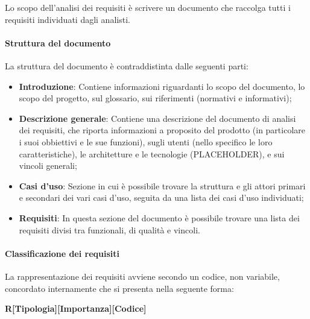 \documentclass[../norme_di_progetto.tex]{subfiles}
\begin{document}
Lo scopo dell'analisi dei requisiti è scrivere un documento che raccolga tutti i requisiti individuati dagli analisti.

\paragraph{Struttura del documento}

La struttura del documento è contraddistinta dalle seguenti parti:
\begin{itemize}
    \item \textbf{Introduzione}: Contiene informazioni riguardanti lo scopo del documento, lo scopo del progetto, sul glossario, sui riferimenti (normativi e informativi);
    \item \textbf{Descrizione generale}: Contiene una descrizione del documento di analisi dei requisiti, che riporta informazioni a proposito del prodotto (in particolare i suoi obbiettivi e le sue funzioni), sugli utenti (nello specifico le loro caratteristiche), le architetture e le tecnologie (PLACEHOLDER), e sui vincoli generali;
    \item \textbf{Casi d'uso}: Sezione in cui è possibile trovare la struttura e gli attori primari e secondari dei vari casi d'uso, seguita da una lista dei casi d'uso individuati;
    \item \textbf{Requisiti}: In questa sezione del documento è possibile trovare una lista dei requisiti divisi tra funzionali, di qualità e vincoli.
\end{itemize}

\paragraph{Classificazione dei requisiti}
La rappresentazione dei requisiti avviene secondo un codice, non variabile, concordato internamente che si presenta nella seguente forma:
\begin{center}
    \textbf{R[Tipologia][Importanza][Codice]}
\end{center}
\end{document}
